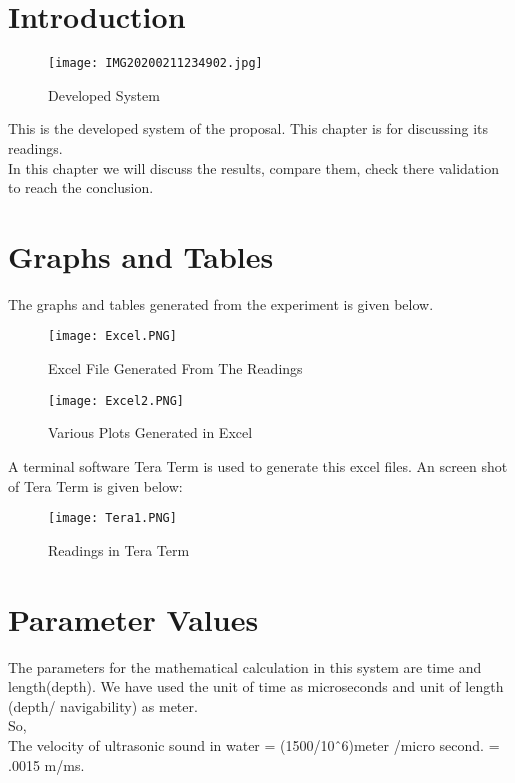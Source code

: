 \documentclass[12pt, top = 1 inch, bottom = 1 inch, left = 1.2 inch, top = .8 inch]{book}
\begin{document}
		\section{Introduction}
		\begin{figure}[h!]	
			\centering
			\texttt{[image: IMG20200211234902.jpg]}
			\caption{Developed System}
		\end{figure}
		This is the developed system of the proposal. This chapter is for discussing its readings.\\
		In this chapter we will discuss the results, compare them, check there validation to reach the conclusion.
		\section{Graphs and Tables}
		The graphs and tables generated from the experiment is given below.
		\begin{figure}[h!]	
			\centering
			\texttt{[image: Excel.PNG]}
			\caption{Excel File Generated From The Readings}
		\end{figure}
		\begin{figure}[h!]	
			\centering
			\texttt{[image: Excel2.PNG]}
			\caption{Various Plots Generated in Excel}
		\end{figure}
		\newpage
		A terminal software Tera Term is used to generate this excel files. An screen shot of Tera Term is given below:
		\begin{figure}[h!]	
			\centering
			\texttt{[image: Tera1.PNG]}
			\caption{Readings in Tera Term}
		\end{figure}
		\newpage
		\section{Parameter Values}
		The parameters for the mathematical calculation in this system are time and length(depth). We have used the unit of time as microseconds and unit of length (depth/ navigability) as meter. \\
		So,\\
		The velocity of ultrasonic sound in water = (1500/10\^\ 6)meter /micro second. = .0015 m/ms.\\
		
\end{document}
